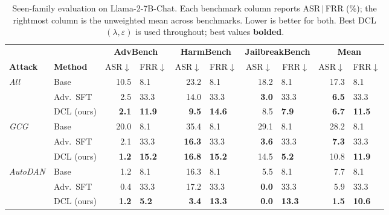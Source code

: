 \documentclass{article}
\begin{document}
\begin{table}[h]
\centering
\caption{Seen-family evaluation on Llama-2-7B-Chat. Each benchmark column reports ASR$\,|\,$FRR (\%); the rightmost column is the unweighted mean across benchmarks. Lower is better for both. Best DCL $(\lambda,\varepsilon)$ is used throughout; best values \textbf{bolded}.}
\label{tab:main-results}
\small
\setlength{\tabcolsep}{4pt}
\begin{tabular}{ll *{4}{r@{\,|\,}l}}
\toprule
 & & \multicolumn{2}{c}{\textbf{AdvBench}} & \multicolumn{2}{c}{\textbf{HarmBench}} & \multicolumn{2}{c}{\textbf{JailbreakBench}} & \multicolumn{2}{c}{\textbf{Mean}} \\
\cmidrule(lr){3-4}\cmidrule(lr){5-6}\cmidrule(lr){7-8}\cmidrule(lr){9-10}
\textbf{Attack} & \textbf{Method} & \multicolumn{1}{c}{ASR$\downarrow$} & \multicolumn{1}{c}{FRR$\downarrow$} & \multicolumn{1}{c}{ASR$\downarrow$} & \multicolumn{1}{c}{FRR$\downarrow$} & \multicolumn{1}{c}{ASR$\downarrow$} & \multicolumn{1}{c}{FRR$\downarrow$} & \multicolumn{1}{c}{ASR$\downarrow$} & \multicolumn{1}{c}{FRR$\downarrow$} \\
\midrule
\multirow{3}{*}{\textit{All}}     & Base       & 10.5 & 8.1  & 23.2 & 8.1  & 18.2 & 8.1  & 17.3 & 8.1  \\
                                   & Adv.\ SFT  & 2.5  & 33.3 & 14.0 & 33.3 & \textbf{3.0}  & 33.3 & \textbf{6.5}  & 33.3 \\
                                   & DCL (ours) & \textbf{2.1}  & \textbf{11.9} & \textbf{9.5}  & \textbf{14.6} & 8.5  & \textbf{7.9}  & \textbf{6.7}  & \textbf{11.5} \\
\midrule
\multirow{3}{*}{\textit{GCG}}     & Base       & 20.0 & 8.1  & 35.4 & 8.1  & 29.1 & 8.1  & 28.2 & 8.1  \\
                                   & Adv.\ SFT  & 2.1  & 33.3 & \textbf{16.3} & 33.3 & \textbf{3.6}  & 33.3 & \textbf{7.3}  & 33.3 \\
                                   & DCL (ours) & \textbf{1.2}  & \textbf{15.2} & \textbf{16.8} & \textbf{15.2} & 14.5 & \textbf{5.2}  & 10.8 & \textbf{11.9} \\
\midrule
\multirow{3}{*}{\textit{AutoDAN}} & Base       & 1.2  & 8.1  & 16.3 & 8.1  & 5.5  & 8.1  & 7.7  & 8.1  \\
                                   & Adv.\ SFT  & 0.4  & 33.3 & 17.2 & 33.3 & \textbf{0.0}  & 33.3 & 5.9  & 33.3 \\
                                   & DCL (ours) & \textbf{1.2}  & \textbf{5.2}  & \textbf{3.4}  & \textbf{13.3} & \textbf{0.0}  & \textbf{13.3} & \textbf{1.5}  & \textbf{10.6} \\

\end{tabular}
\end{table}
\end{document}
